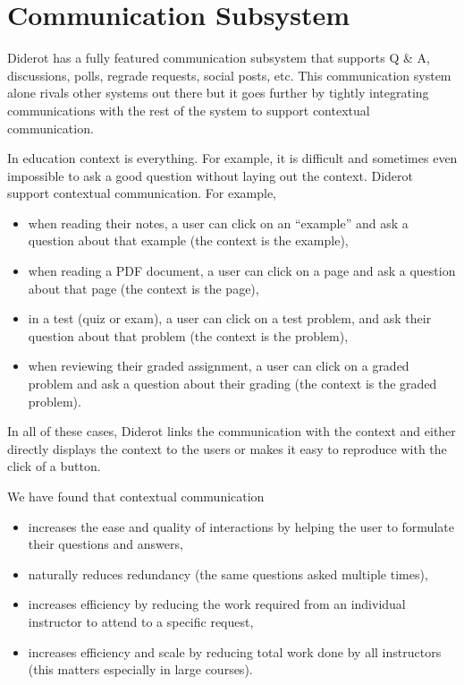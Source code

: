 \chapter{Communication Subsystem}
\label{ch:posts}

Diderot has a fully featured communication subsystem that supports Q \&
A, discussions, polls, regrade requests, social posts, etc.
%
This communication system alone rivals other systems out there but it
goes further by tightly integrating communications with the rest of
the system to support contextual communication.

\begin{gram}
In education context is everything.
%
For example, it is difficult and sometimes even impossible to ask a
good question without laying out the context.
%
Diderot support contextual communication.
%  
For example,
\begin{itemize}
\item when reading their notes, a user can click on an
``example'' and ask a question about that example (the context is the example),
%

\item when reading a PDF document, a user can click on a page and
  ask a question about that page (the context is the page),

\item in a test (quiz or exam), a user can click on a test problem, and ask their question about that problem (the context is the problem),

\item when reviewing their graded assignment, a user can click on a graded problem and ask a question about their grading (the context is the graded problem).  
\end{itemize}
%
In all of these cases, Diderot links the communication with the
context and either directly displays the context to the users or makes
it easy to reproduce with the click of a button.
%
\end{gram}

\begin{gram}
We have found that contextual communication
\begin{itemize}
\item increases the ease and quality of interactions by helping the user to formulate their questions and answers,
\item naturally reduces redundancy (the same questions asked multiple times),
\item increases efficiency by reducing the work required from an
  individual instructor to attend to a specific request,
\item increases efficiency and scale by reducing total work done by
  all instructors (this matters especially in large courses).
\end{itemize}
\end{gram}
